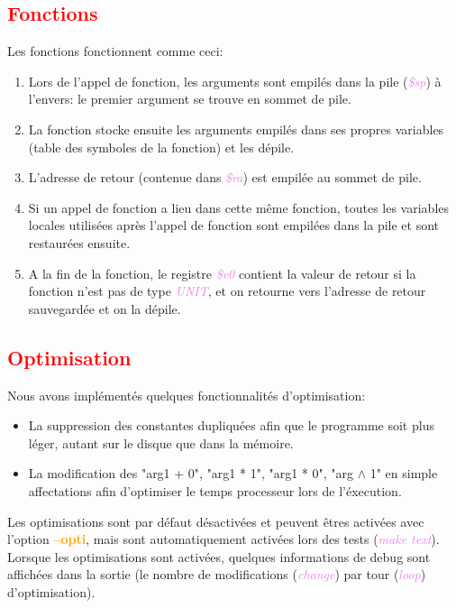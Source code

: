 \documentclass[a4paper]{article}
\let\oldtextbf\textbf
\renewcommand{\textbf}[1]{\textcolor{orange}{\oldtextbf{#1}}}
\let\oldtextit\textit
\renewcommand{\textit}[1]{\textcolor{violet}{\oldtextit{#1}}}
\newcommand{\csection}[1]{\textcolor{red}{\section{#1}}}
\begin{document}
\csection{Fonctions}

Les fonctions fonctionnent comme ceci:
\begin{enumerate}
    \item Lors de l'appel de fonction, les arguments sont empilés dans la pile (\textit{\$sp}) à l'envers: le premier argument se trouve en sommet de pile.
    \item La fonction stocke ensuite les arguments empilés dans ses propres variables (table des symboles de la fonction) et les dépile.
    \item L'adresse de retour (contenue dans \textit{\$ra}) est empilée au sommet de pile.
    \item Si un appel de fonction a lieu dans cette même fonction, toutes les variables locales utilisées après l'appel de fonction sont empilées dans la pile et sont restaurées ensuite.
    \item A la fin de la fonction, le registre \textit{\$v0} contient la valeur de retour si la fonction n'est pas de type \textit{UNIT}, et on retourne vers l'adresse de retour sauvegardée et on la dépile.
\end{enumerate}

\csection{Optimisation}

Nous avons implémentés quelques fonctionnalités d'optimisation:
\begin{itemize}
    \item La suppression des constantes dupliquées afin que le programme soit plus léger, autant sur le disque que dans la mémoire.
    \item La modification des "arg1 + 0", "arg1 * 1", "arg1 * 0", "arg $\wedge$ 1" en simple affectations afin d'optimiser le temps processeur lors de l'éxecution.
\end{itemize}

Les optimisations sont par défaut désactivées et peuvent êtres activées avec l'option \textbf{--opti}, mais sont automatiquement activées lors des tests (\textit{make text}).
Lorsque les optimisations sont activées, quelques informations de debug sont affichées dans la sortie (le nombre de modifications (\textit{change}) par tour (\textit{loop}) d'optimisation).
\end{document}
